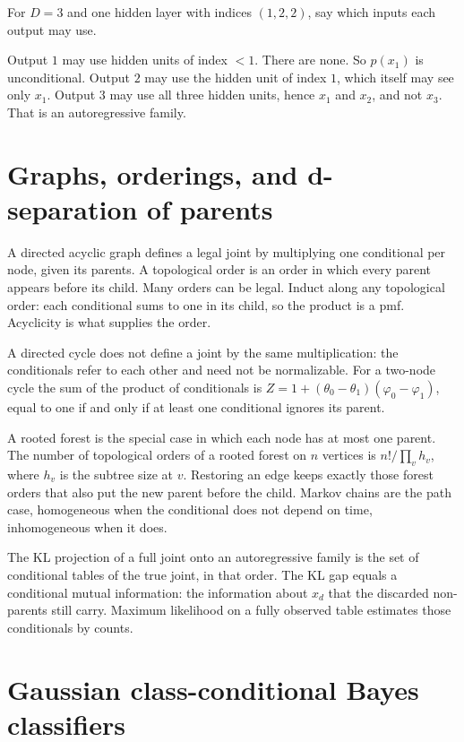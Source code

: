 \begin{practbox}
For $D=3$ and one hidden layer with indices $(1,2,2)$, say which inputs each output may use.
\end{practbox}
\begin{solbox}
Output $1$ may use hidden units of index $<1$. There are none. So $p(x_1)$ is unconditional. Output $2$ may use the hidden unit of index $1$, which itself may see only $x_1$. Output $3$ may use all three hidden units, hence $x_1$ and $x_2$, and not $x_3$. That is an autoregressive family.
\end{solbox}

\section{Graphs, orderings, and d-separation of parents}

A directed acyclic graph defines a legal joint by multiplying one conditional per node, given its parents. A topological order is an order in which every parent appears before its child. Many orders can be legal. Induct along any topological order: each conditional sums to one in its child, so the product is a pmf. Acyclicity is what supplies the order.

A directed cycle does not define a joint by the same multiplication: the conditionals refer to each other and need not be normalizable. For a two-node cycle the sum of the product of conditionals is $Z=1+(\theta_0-\theta_1)(\varphi_0-\varphi_1)$, equal to one if and only if at least one conditional ignores its parent.

A rooted forest is the special case in which each node has at most one parent. The number of topological orders of a rooted forest on $n$ vertices is $n!/\prod_v h_v$, where $h_v$ is the subtree size at $v$. Restoring an edge keeps exactly those forest orders that also put the new parent before the child. Markov chains are the path case, homogeneous when the conditional does not depend on time, inhomogeneous when it does.

The KL projection of a full joint onto an autoregressive family is the set of conditional tables of the true joint, in that order. The KL gap equals a conditional mutual information: the information about $x_d$ that the discarded non-parents still carry. Maximum likelihood on a fully observed table estimates those conditionals by counts.

\section{Gaussian class-conditional Bayes classifiers}

